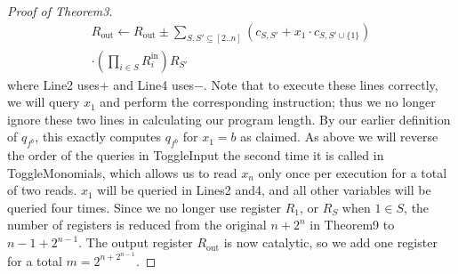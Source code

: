 \documentclass[10pt,a4paper]{article}
\begin{document}
\begin{proof}[Proof of Theorem3]
\begin{multline*}
R_{\mathrm{out}}\leftarrow R_{\mathrm{out}}\pm\sum_{S,S'\subseteq[2..n]}(c_{S,S'}+x_1\cdot c_{S,S'\cup\{1\}})\\
\cdot\left(\prod_{i\in S}R_i^{\mathrm{in}}\right)R_{S'}
\end{multline*}
where Line2 uses+ and Line4 uses−. Note that to execute these lines correctly, we will query $x_1$ and perform the corresponding instruction; thus we no longer ignore these two lines in calculating our program length.
By our earlier definition of $q_{f^b}$, this exactly computes $q_{f^b}$ for $x_1=b$ as claimed. As above we will reverse the order of the queries in ToggleInput the second time it is called in ToggleMonomials, which allows us to read $x_n$ only once per execution for a total of two reads. $x_1$ will be queried in Lines2 and4, and all other variables will be queried four times.
Since we no longer use register $R_1$, or $R_S$ when $1\in S$, the number of registers is reduced from the original $n+2^n$ in Theorem9 to $n-1+2^{n-1}$. The output register $R_{\mathrm{out}}$ is now catalytic, so we add one register for a total $m=2^{n+2^{n-1}}$.
\end{proof}
\end{document}
